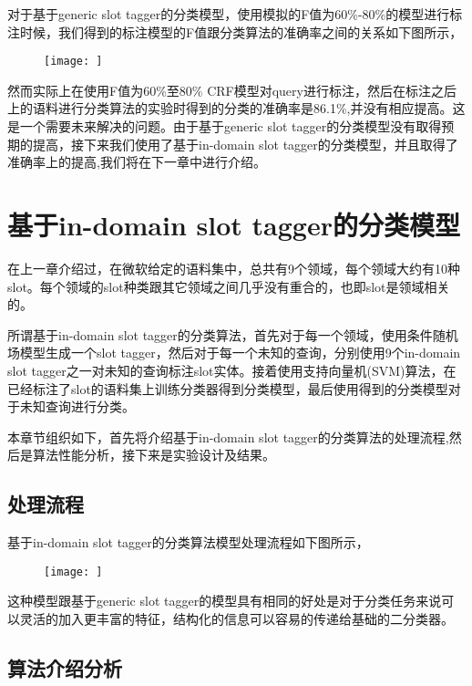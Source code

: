 \documentclass[master]{njuthesis}
\begin{document}
\begin{enumerate}
\begin{enumerate}
\begin{enumerate}
    对于基于generic slot tagger的分类模型，使用模拟的F值为60\%-80\%的模型进行标注时候，我们得到的标注模型的F值跟分类算法的准确率之间的关系如下图所示，

    \begin{figure}[htbp]
      \centering
      \texttt{[image: ]}
      \caption{}\label{fig:test1}
    \end{figure}
    
    然而实际上在使用F值为60\%至80\% CRF模型对query进行标注，然后在标注之后上的语料进行分类算法的实验时得到的分类的准确率是86.1\%,并没有相应提高。这是一个需要未来解决的问题。由于基于generic slot tagger的分类模型没有取得预期的提高，接下来我们使用了基于in-domain slot tagger的分类模型，并且取得了准确率上的提高,我们将在下一章中进行介绍。

\section{基于in-domain slot tagger的分类模型}

    在上一章介绍过，在微软给定的语料集中，总共有9个领域，每个领域大约有10种slot。每个领域的slot种类跟其它领域之间几乎没有重合的，也即slot是领域相关的。

    所谓基于in-domain slot tagger的分类算法，首先对于每一个领域，使用条件随机场模型生成一个slot tagger，然后对于每一个未知的查询，分别使用9个in-domain slot tagger之一对未知的查询标注slot实体。接着使用支持向量机(SVM)算法，在已经标注了slot的语料集上训练分类器得到分类模型，最后使用得到的分类模型对于未知查询进行分类。
    
    本章节组织如下，首先将介绍基于in-domain slot tagger的分类算法的处理流程,然后是算法性能分析，接下来是实验设计及结果。

\subsection{处理流程}

    基于in-domain slot tagger的分类算法模型处理流程如下图所示，
    \begin{figure}[htbp]
      \centering
      \texttt{[image: ]}
      \caption{}\label{fig:test1}
    \end{figure}
    
    这种模型跟基于generic slot tagger的模型具有相同的好处是对于分类任务来说可以灵活的加入更丰富的特征，结构化的信息可以容易的传递给基础的二分类器。

\subsection{算法介绍分析}
    

\end{enumerate}
\end{enumerate}
\end{enumerate}
\end{document}
